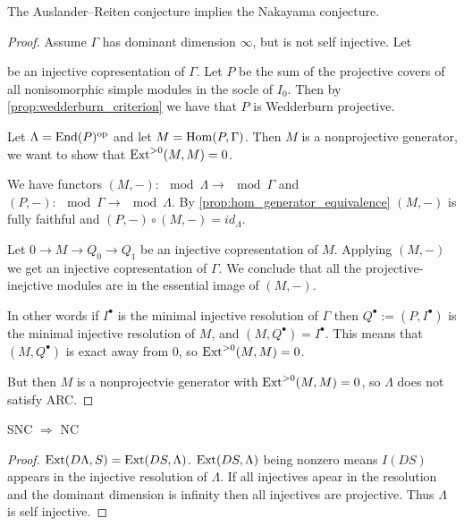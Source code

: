 \begin{theorem}
	The Auslander--Reiten conjecture implies the Nakayama conjecture.
	\begin{proof}
		Assume $\Gamma$ has dominant dimension $\infty$, but is not self injective. Let
		\begin{center}
		\end{center}
		be an injective copresentation of $\Gamma$. Let $P$ be the sum of the projective covers of all nonisomorphic simple modules in the socle of $I_0$. Then by \cref{prop:wedderburn_criterion} we have that $P$ is Wedderburn projective.
		
		Let $\Lambda = \operatorname{End}(P)^{\operatorname{op}}$ and let $M = \operatorname{Hom}(P, \Gamma)$. Then $M$ is a nonprojective generator, we want to show that $\operatorname{Ext}^{>0}(M,M)=0$.
		
		We have functors $(M,-)\colon\mod\Lambda \to \mod\Gamma$ and $(P,-)\colon\mod\Gamma \to \mod\Lambda$. By \cref{prop:hom_generator_equivalence} $(M, -)$ is fully faithful and $(P,-)\circ (M,-) = id_{\Lambda}$.
		
		Let $0\to M \to Q_0 \to Q_1$ be an injective copresentation of $M$. Applying $(M,-)$ we get an injective copresentation of $\Gamma$. We conclude that all the projective-inejctive modules are in the essential image of $(M,-)$.
		
		In other words if $I^\bullet$ is the minimal injective resolution of $\Gamma$ then $Q^\bullet := (P, I^\bullet)$ is the minimal injective resolution of $M$, and $(M, Q^\bullet)=I^\bullet$. This means that $(M, Q^\bullet)$ is exact away from 0, so $\operatorname{Ext}^{>0}(M,M)=0$. 
		
		But then $M$ is a nonprojectvie generator with $\operatorname{Ext}^{>0}(M,M)=0$, so $\Lambda$ does not satisfy ARC.
	\end{proof}
\end{theorem}

\begin{prop}\cite{AR75} 
	SNC $\Rightarrow$ NC
	\begin{proof}
		$\operatorname{Ext}(D\Lambda, S) = \operatorname{Ext}(DS, \Lambda)$. $\operatorname{Ext}(DS, \Lambda)$ being nonzero means $I(DS)$ appears in the injective resolution of $\Lambda$. If all injectives apear in the resolution and the dominant dimension is infinity then all injectives are projective. Thus $\Lambda$ is self injective.
	\end{proof}
\end{prop}

